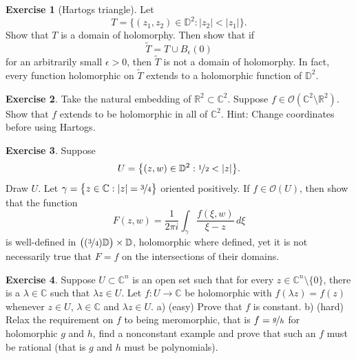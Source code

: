\documentclass[12pt,openany]{book}
\newcommand{\sabs}[1]{\lvert {#1} \rvert}
\newcommand{\C}{{\mathbb{C}}}
\newcommand{\R}{{\mathbb{R}}}
\newcommand{\D}{{\mathbb{D}}}
\newcommand{\sO}{{\mathscr{O}}}
\newcommand{\myindex}[1]{#1\index{#1}}
\theoremstyle{plain}
\theoremstyle{remark}
\theoremstyle{definition}
\newenvironment{exbox}{%
    \def\FrameCommand{\vrule width 1pt \relax\hspace {10pt}}%
    \MakeFramed {\advance \hsize -\width \FrameRestore }%
}{%
    \endMakeFramed
}
\theoremstyle{exercise}
\newtheorem{exercise}{Exercise}[section]
\theoremstyle{example}
\begin{document}
\begin{exbox}
\begin{exercise}[\myindex{Hartogs triangle}]\label{exercise:hartogstriangle}
Let
\begin{equation*}
T = \bigl\{ (z_1,z_2) \in \D^2 : \sabs{z_2} < \sabs{z_1} \bigr\} .
\end{equation*}
Show that $T$ is a domain of holomorphy.  Then show that if
\begin{equation*}
\widetilde{T} = T \cup B_{\epsilon}(0)
\end{equation*}
for an arbitrarily small $\epsilon > 0$, then $\widetilde{T}$ is not a domain
of holomorphy.  In fact, every function holomorphic on $\widetilde{T}$
extends to a holomorphic function of $\D^2$.
\end{exercise}

\begin{exercise} \label{exercise:C2minusR2}
Take the natural embedding of $\R^2 \subset \C^2$.  Suppose 
$f \in \sO(\C^2 \setminus \R^2)$.  Show that $f$ extends to be holomorphic
in all of $\C^2$.  Hint: Change coordinates before using Hartogs.
\end{exercise}

\begin{exercise}
Suppose 
\begin{equation*}
U = \bigl\{ (z,w) \in \D^2 : \nicefrac{1}{2} < \sabs{z} \bigr\} .
\end{equation*}
Draw $U$.  
Let $\gamma = \bigl\{ z \in \C : \sabs{z} = \nicefrac{3}{4} \bigr\}$ oriented positively.
If $f \in \sO(U)$, then show that the function
\begin{equation*}
F(z,w)
=
\frac{1}{2\pi i}
\int_\gamma \frac{f(\xi,w)}{\xi-z} \, d\xi
\end{equation*}
is well-defined in
$\bigl( (\nicefrac{3}{4}) \D \bigr) \times \D$, holomorphic where defined, yet
it is not necessarily true that $F = f$ on the intersections of their
domains.
\end{exercise}

\begin{exercise}
Suppose $U \subset \C^n$ is an open set such that for every
$z \in \C^n \setminus \{ 0 \}$, there is a $\lambda \in \C$ such that
$\lambda z \in U$.  Let $f \colon U \to \C$ be holomorphic with
$f(\lambda z) = f(z)$ whenever $z \in U$, $\lambda \in \C$ and $\lambda z
\in U$.  a) (easy) Prove that $f$ is constant.  b) (hard) Relax the requirement on
$f$ to being meromorphic, that is $f = \nicefrac{g}{h}$
for holomorphic $g$ and $h$,
find a nonconstant example and prove that such an $f$ must be rational (that
is $g$ and $h$ must be polynomials).
\end{exercise}
\end{exbox}
\end{document}
